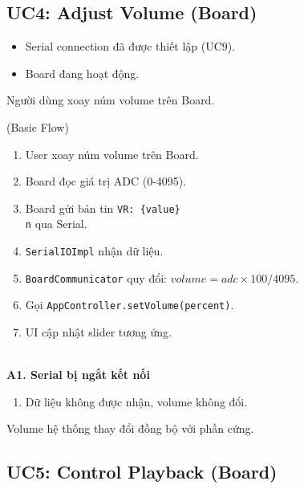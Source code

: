 \subsection{UC4: Adjust Volume (Board)}

\begin{description}[style=multiline, leftmargin=3cm, font=\bfseries]
    \item[Pre-conditions] 
    \begin{itemize}
        \item Serial connection đã được thiết lập (UC9).
        \item Board đang hoạt động.
    \end{itemize}

    \item[Trigger] Người dùng xoay núm volume trên Board.

    \item[Main Success Scenario] (Basic Flow)
    \begin{enumerate}
        \item User xoay núm volume trên Board.
        \item Board đọc giá trị ADC (0-4095).
        \item Board gửi bản tin \texttt{VR: \{value\}\\n} qua Serial.
        \item \texttt{SerialIOImpl} nhận dữ liệu.
        \item \texttt{BoardCommunicator} quy đổi: $volume = adc \times 100 / 4095$.
        \item Gọi \texttt{AppController.setVolume(percent)}.
        \item UI cập nhật slider tương ứng.
    \end{enumerate}

    \item[Alternative Flows] \hfill \\
    \textbf{A1. Serial bị ngắt kết nối}
    \begin{enumerate}
        \item Dữ liệu không được nhận, volume không đổi.
    \end{enumerate}

    \item[Post-conditions] Volume hệ thống thay đổi đồng bộ với phần cứng.
\end{description}

\newpage
\subsection{UC5: Control Playback (Board)}


